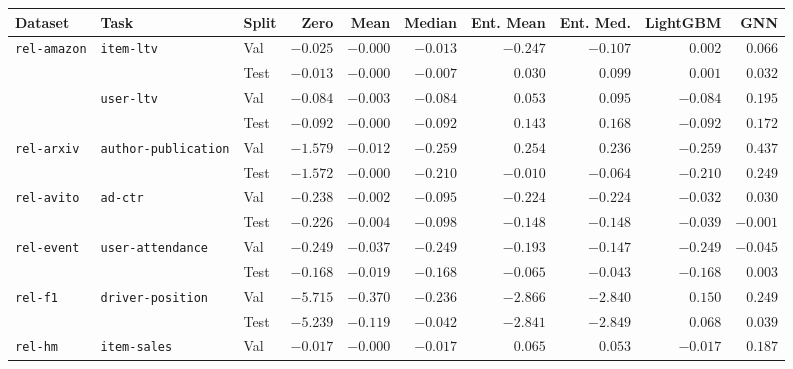 \begin{tabular}{lllrrrrrrr}
\toprule
Dataset & Task & Split & Zero & Mean & Median & Ent. Mean & Ent. Med. & LightGBM & GNN \\
\midrule
\multirow[c]{4}{*}{\texttt{rel-amazon}} & \multirow[c]{2}{*}{\texttt{item-ltv}} & Val & $-0.025$ & $-0.000$ & $-0.013$ & $-0.247$ & $-0.107$ & $0.002$ & $\bm{0.066}$ \\
 &  & Test & $-0.013$ & $-0.000$ & $-0.007$ & $0.030$ & $\bm{0.099}$ & $0.001$ & $0.032$ \\
\cmidrule{2-10}
 & \multirow[c]{2}{*}{\texttt{user-ltv}} & Val & $-0.084$ & $-0.003$ & $-0.084$ & $0.053$ & $0.095$ & $-0.084$ & $\bm{0.195}$ \\
 &  & Test & $-0.092$ & $-0.000$ & $-0.092$ & $0.143$ & $0.168$ & $-0.092$ & $\bm{0.172}$ \\
\cmidrule{1-10} \cmidrule{2-10}
\multirow[c]{2}{*}{\texttt{rel-arxiv}} & \multirow[c]{2}{*}{\texttt{author-publication}} & Val & $-1.579$ & $-0.012$ & $-0.259$ & $0.254$ & $0.236$ & $-0.259$ & $\bm{0.437}$ \\
 &  & Test & $-1.572$ & $-0.000$ & $-0.210$ & $-0.010$ & $-0.064$ & $-0.210$ & $\bm{0.249}$ \\
\cmidrule{1-10} \cmidrule{2-10}
\multirow[c]{2}{*}{\texttt{rel-avito}} & \multirow[c]{2}{*}{\texttt{ad-ctr}} & Val & $-0.238$ & $-0.002$ & $-0.095$ & $-0.224$ & $-0.224$ & $-0.032$ & $\bm{0.030}$ \\
 &  & Test & $-0.226$ & $-0.004$ & $-0.098$ & $-0.148$ & $-0.148$ & $-0.039$ & $\bm{-0.001}$ \\
\cmidrule{1-10} \cmidrule{2-10}
\multirow[c]{2}{*}{\texttt{rel-event}} & \multirow[c]{2}{*}{\texttt{user-attendance}} & Val & $-0.249$ & $\bm{-0.037}$ & $-0.249$ & $-0.193$ & $-0.147$ & $-0.249$ & $-0.045$ \\
 &  & Test & $-0.168$ & $-0.019$ & $-0.168$ & $-0.065$ & $-0.043$ & $-0.168$ & $\bm{0.003}$ \\
\cmidrule{1-10} \cmidrule{2-10}
\multirow[c]{2}{*}{\texttt{rel-f1}} & \multirow[c]{2}{*}{\texttt{driver-position}} & Val & $-5.715$ & $-0.370$ & $-0.236$ & $-2.866$ & $-2.840$ & $0.150$ & $\bm{0.249}$ \\
 &  & Test & $-5.239$ & $-0.119$ & $-0.042$ & $-2.841$ & $-2.849$ & $\bm{0.068}$ & $0.039$ \\
\cmidrule{1-10} \cmidrule{2-10}
\multirow[c]{2}{*}{\texttt{rel-hm}} & \multirow[c]{2}{*}{\texttt{item-sales}} & Val & $-0.017$ & $-0.000$ & $-0.017$ & $0.065$ & $0.053$ & $-0.017$ & $\bm{0.187}$ \\

\end{tabular}
